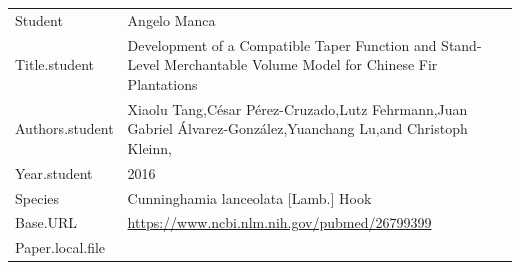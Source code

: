 \documentclass[]{article}
\begin{document}
\begin{longtable}[]{@{}ll@{}}
\toprule
\endhead
\begin{minipage}[t]{0.21\columnwidth}\raggedright
Student\strut
\end{minipage} & \begin{minipage}[t]{0.73\columnwidth}\raggedright
Angelo Manca\strut
\end{minipage}\tabularnewline
\begin{minipage}[t]{0.21\columnwidth}\raggedright
Title.student\strut
\end{minipage} & \begin{minipage}[t]{0.73\columnwidth}\raggedright
Development of a Compatible Taper Function and Stand-Level Merchantable
Volume Model for Chinese Fir Plantations\strut
\end{minipage}\tabularnewline
\begin{minipage}[t]{0.21\columnwidth}\raggedright
Authors.student\strut
\end{minipage} & \begin{minipage}[t]{0.73\columnwidth}\raggedright
Xiaolu Tang,César Pérez-Cruzado,Lutz Fehrmann,Juan Gabriel
Álvarez-González,Yuanchang Lu,and Christoph Kleinn,\strut
\end{minipage}\tabularnewline
\begin{minipage}[t]{0.21\columnwidth}\raggedright
Year.student\strut
\end{minipage} & \begin{minipage}[t]{0.73\columnwidth}\raggedright
2016\strut
\end{minipage}\tabularnewline
\begin{minipage}[t]{0.21\columnwidth}\raggedright
Species\strut
\end{minipage} & \begin{minipage}[t]{0.73\columnwidth}\raggedright
Cunninghamia lanceolata {[}Lamb.{]} Hook\strut
\end{minipage}\tabularnewline
\begin{minipage}[t]{0.21\columnwidth}\raggedright
Base.URL\strut
\end{minipage} & \begin{minipage}[t]{0.73\columnwidth}\raggedright
\url{https://www.ncbi.nlm.nih.gov/pubmed/26799399}\strut
\end{minipage}\tabularnewline
\begin{minipage}[t]{0.21\columnwidth}\raggedright
Paper.local.file\strut
\end{minipage} & \begin{minipage}[t]{0.73\columnwidth}\raggedright

\end{minipage}
\end{longtable}
\end{document}
